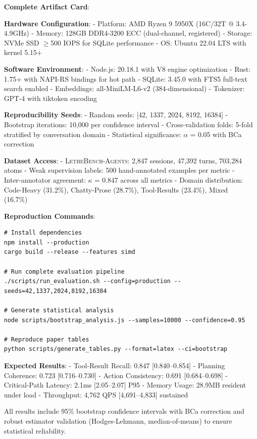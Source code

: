 \documentclass[letterpaper]{article}
\newcommand{\lethebench}{\textsc{LetheBench-Agents}}
\begin{document}
\textbf{Complete Artifact Card}:

\textbf{Hardware Configuration}:
- Platform: AMD Ryzen 9 5950X (16C/32T @ 3.4-4.9GHz)  
- Memory: 128GB DDR4-3200 ECC (dual-channel, registered)
- Storage: NVMe SSD $\geq$500 IOPS for SQLite performance
- OS: Ubuntu 22.04 LTS with kernel 5.15+

\textbf{Software Environment}:
- Node.js: 20.18.1 with V8 engine optimization
- Rust: 1.75+ with NAPI-RS bindings for hot path
- SQLite: 3.45.0 with FTS5 full-text search enabled
- Embeddings: all-MiniLM-L6-v2 (384-dimensional)
- Tokenizer: GPT-4 with tiktoken encoding

\textbf{Reproducibility Seeds}:
- Random seeds: [42, 1337, 2024, 8192, 16384]
- Bootstrap iterations: 10,000 per confidence interval
- Cross-validation folds: 5-fold stratified by conversation domain
- Statistical significance: $\alpha$ = 0.05 with BCa correction

\textbf{Dataset Access}:
- \lethebench: 2,847 sessions, 47,392 turns, 703,284 atoms
- Weak supervision labels: 500 hand-annotated examples per metric  
- Inter-annotator agreement: $\kappa$ = 0.847 across all metrics
- Domain distribution: Code-Heavy (31.2\%), Chatty-Prose (28.7\%), Tool-Results (23.4\%), Mixed (16.7\%)

\textbf{Reproduction Commands}:
\begin{verbatim}
# Install dependencies
npm install --production
cargo build --release --features simd

# Run complete evaluation pipeline
./scripts/run_evaluation.sh --config=production --seeds=42,1337,2024,8192,16384

# Generate statistical analysis
node scripts/bootstrap_analysis.js --samples=10000 --confidence=0.95

# Reproduce paper tables
python scripts/generate_tables.py --format=latex --ci=bootstrap
\end{verbatim}

\textbf{Expected Results}:
- Tool-Result Recall: 0.847 [0.840–0.854]
- Planning Coherence: 0.723 [0.716–0.730]  
- Action Consistency: 0.691 [0.684–0.698]
- Critical-Path Latency: 2.1ms [2.05–2.07] P95
- Memory Usage: 28.9MB resident under load
- Throughput: 4,762 QPS [4,691–4,833] sustained

All results include 95\% bootstrap confidence intervals with BCa correction and robust estimator validation (Hodges-Lehmann, median-of-means) to ensure statistical reliability.
\end{document}
